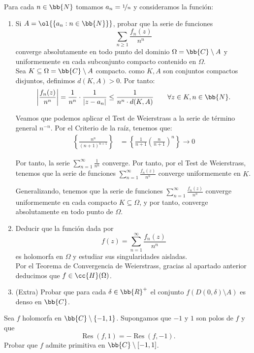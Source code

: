 \documentclass[12pt]{article}
\DeclareMathOperator{\Res}{Res}
\begin{document}
    \begin{ejercicio}[2.5 puntos]
        Para cada $n \in \bb{N}$ tomamos $a_n = \nicefrac{1}{n}$ y consideramos la función:
        \begin{enumerate}
            \item Si $A = \ol{\{a_n : n \in \bb{N}\}}$, probar que la serie de funciones
            \[
                \sum_{n \geq 1} \frac{f_n(z)}{n^n}
            \]
            converge absolutamente en todo punto del dominio $\Omega = \bb{C}\setminus A$ y uniformemente en cada subconjunto compacto contenido en $\Omega$.\\

            Sea $K \subseteq \Omega=\bb{C}\setminus A$ compacto. como $K,A$ son conjuntos compactos disjuntos, definimos $d(K,A)>0$. Por tanto:
            \begin{equation*}
                \left|\dfrac{f_n(z)}{n^n}\right| = \frac{1}{n^n}\cdot \dfrac{1}{|z - a_n|} \leq \frac{1}{n^n\cdot d(K,A)}\qquad \forall z\in K, n\in \bb{N}.
            \end{equation*}

            Veamos que podemos aplicar el Test de Weierstrass a la serie de término general $n^{-n}$. Por el Criterio de la raíz, tenemos que:
            \begin{align*}
                \left\{\frac{n^n}{{(n+1)}^{n+1}}\right\} &= \left\{\frac{1}{n+1}\left(\frac{n}{n+1}\right)^n\right\}\to 0
            \end{align*}

            Por tanto, la serie $\sum\limits_{n=1}^{\infty} \frac{1}{n^n}$ converge. Por tanto, por el Test de Weierstrass, tenemos que la serie de funciones $\sum\limits_{n=1}^{\infty} \frac{f_n(z)}{n^n}$ converge uniformemente en $K$.

            Generalizando, tenemos que la serie de funciones $\sum\limits_{n=1}^{\infty} \frac{f_n(z)}{n^n}$ converge uniformemente en cada compacto $K\subseteq \Omega$, y por tanto, converge absolutamente en todo punto de $\Omega$.


            \item Deducir que la función dada por
            \[
                f(z) = \sum_{n=1}^{\infty} \frac{f_n(z)}{n^n}
            \]
            es holomorfa en $\Omega$ y estudiar sus singularidades aisladas.\\

            Por el Teorema de Convergencia de Weierstrass, gracias al apartado anterior deducimos que $f\in \cc{H}(\Omega)$.

            \item (Extra) Probar que para cada $\delta\in \bb{R}^+$ el conjunto $f\left(D(0,\delta)\setminus A\right)$ es denso en $\bb{C}$.
        \end{enumerate}
    \end{ejercicio}

    \begin{ejercicio}[2.5 puntos]
        Sea $f$ holomorfa en $\bb{C}\setminus\{-1, 1\}$. Supongamos que $-1$ y $1$ son polos de $f$ y que
        \[
            \Res(f, 1) = -\Res(f, -1).
        \]
        Probar que $f$ admite primitiva en $\bb{C} \setminus [-1, 1]$.
    \end{ejercicio}
\end{document}
